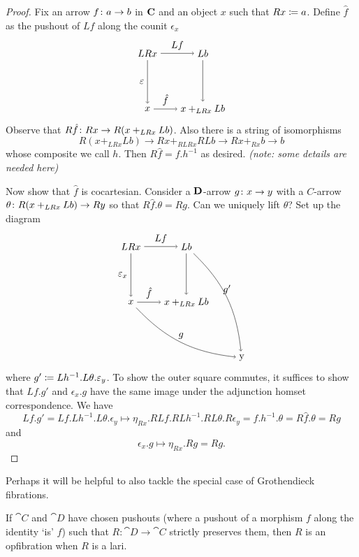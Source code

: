 \begin{proof}
	Fix an arrow $ f \colon a \to b $ in $ \mathbf{C} $ and an object $ x $ such that $ Rx \coloneqq a $.  Define $ \hat{f} $ as the pushout of $ Lf $ along the counit $ \epsilon_x $
	\[
	\begin{tikzpicture}
		\node (ul) at (0,2) {$ LRx $};
		\node (ll) at (0,0) {$ x $};
		\node (ur) at (2,2) {$ Lb $};
		\node (lr) at (2,0) {$ x +_{LRx} Lb$};
		\draw [->] (ul) to node [left] {$ \epsilon $} (ll);
		\draw [->] (ul) to node [above] {$ Lf $} (ur);
		\draw [->] (ll) to node [above] {$ \hat{f} $} (lr);
		\draw [->] (ur) to (lr);
	\end{tikzpicture}
	\] 
	Observe that $ R \hat{f} \colon Rx \to R( x +_{LRx} Lb ) $. Also there is a string of isomorphisms  
	\[
		R( x +_{LRx} Lb ) \to Rx +_{RLRx} RLb \to Rx +_{Rx} b \to b
	\]
	whose composite we call $ h $. Then $ R \hat{f} = f . h^{-1} $ as desired.  \emph{(note: some details are needed here)}
	
	Now show that $ \hat{f} $ is cocartesian.  Consider a $ \mathbf{D} $-arrow $ g \colon x \to y $ with a $ C $-arrow $ \theta \colon R( x +_{LRx} Lb ) \to Ry  $ so that $ R \hat{f} . \theta = Rg $.  Can we uniquely lift $ \theta $? Set up the diagram
	\[
	\begin{tikzpicture}
		\node (ul) at (0,2) {$ LRx $};
		\node (ll) at (0,0) {$ x $};
		\node (ur) at (2,2) {$ Lb $};
		\node (lr) at (2,0) {$ x +_{LRx} Lb$};
		\node (comp) at (4,-2) {y};
		\draw [->] (ul) to node [left] {$ \epsilon_x $} (ll);
		\draw [->] (ul) to node [above] {$ Lf $} (ur);
		\draw [->] (ll) to node [above] {$ \hat{f} $} (lr);
		\draw [->] (ur) to (lr);
		\draw [->] (ll) to [bend right=20] node [above] {$ g $} (comp);
		\draw [->] (ur) to [bend left=20] node [above] {$ g' $} (comp);
	\end{tikzpicture}
	\] 
	where $ g' \coloneqq Lh^{-1} . L\theta.\varepsilon_y $.  To show the outer square commutes, it suffices to show that $ Lf . g' $ and $ \epsilon_x . g $ have the same image under the adjunction homset correspondence.  We have
	\[
		Lf . g' = Lf . Lh^{-1} . L\theta.\epsilon_y 
			\mapsto \eta_{Rx} . RLf . RLh^{-1} . RL\theta.R\epsilon_y 
			= f . h^{-1} . \theta  
			= R \hat{f} . \theta 
			= Rg
	\]
	and 
	\[
	\epsilon_x . g \mapsto \eta_{Rx} . Rg = Rg.	
	\]
\end{proof}

Perhaps it will be helpful to also tackle the special case of Grothendieck fibrations.

\begin{cnj}
If $\cat{C}$ and $\cat{D}$ have chosen pushouts (where a pushout of a morphism $f$ along the
identity `is' $f$) such that $R\colon\cat{D}\to\cat{C}$ strictly preserves them, then $R$ is an opfibration
when $R$ is a lari.
\end{cnj}

